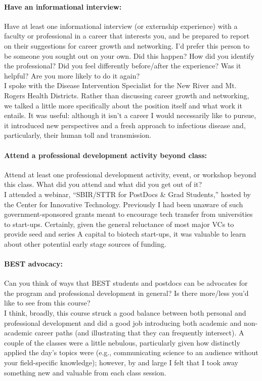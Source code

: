 \documentclass[11pt,letterpaper,final] {article}
\begin{document}
	
	
	\paragraph{Have an informational interview:} Have at least one informational interview (or externship experience) with a faculty or professional in a career that interests you, and be prepared to report on their suggestions for career growth and networking. I’d prefer this person to be someone you sought out on your own. Did this happen? How did you identify the professional? Did you feel differently before/after the experience? Was it helpful? Are you more likely to do it again?\\
	
	I spoke with the Disease Intervention Specialist for the New River and Mt. Rogers Health Districts. Rather than discussing career growth and networking, we talked a little more specifically about the position itself and what work it entails. It was useful: although it isn't a career I would necessarily like to pursue, it introduced new perspectives and a fresh approach to infectious disease and, particularly, their human toll and transmission.
	
	\paragraph{Attend a professional development activity beyond class:} Attend at least one professional development activity, event, or workshop beyond this class. What did you attend and what did you get out of it?\\
	
	I attended a webinar, ``SBIR/STTR for PostDocs & Grad Students,'' hosted by the Center for Innovative Technology. Previously I had been unaware of such government-sponsored grants meant to encourage tech transfer from universities to start-ups. Certainly, given the general reluctance of most major VCs to provide seed and series A capital to biotech start-ups, it was valuable to learn about other potential early stage sources of funding.
	
	\paragraph{BEST advocacy:} Can you think of ways that BEST students and postdocs can be advocates for the program and professional development in general? Is there more/less you'd like to see from this course?\\
	
	I think, broadly, this course struck a good balance between both personal and professional development and did a good job introducing both academic and non-academic career paths (and illustrating that they can frequently intersect). A couple of the classes were a little nebulous, particularly given how distinctly applied the day's topics were (e.g., communicating science to an audience without your field-specific knowledge); however, by and large I felt that I took away something new and valuable from each class session.


% 
% 
\end{document}
